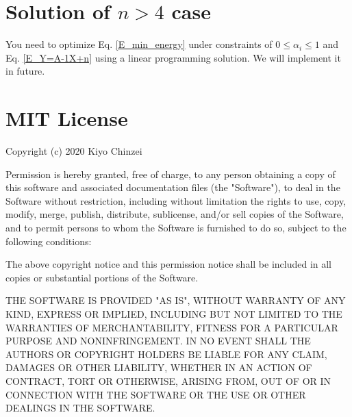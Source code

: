 \documentclass[dvipdfmx,uplatex]{article}
\begin{document}
\section{Solution of $n > 4$ case}
You need to optimize Eq. \ref{E_min_energy} under constraints of $0 \leq \alpha_i \leq 1$ and Eq. \ref{E_Y=A-1X+n} using a linear programming solution.
We will implement it in future.




\section*{MIT License}

Copyright (c) 2020 Kiyo Chinzei

Permission is hereby granted, free of charge, to any person obtaining a copy
of this software and associated documentation files (the "Software"), to deal
in the Software without restriction, including without limitation the rights
to use, copy, modify, merge, publish, distribute, sublicense, and/or sell
copies of the Software, and to permit persons to whom the Software is
furnished to do so, subject to the following conditions:

The above copyright notice and this permission notice shall be included in all
copies or substantial portions of the Software.

THE SOFTWARE IS PROVIDED "AS IS", WITHOUT WARRANTY OF ANY KIND, EXPRESS OR
IMPLIED, INCLUDING BUT NOT LIMITED TO THE WARRANTIES OF MERCHANTABILITY,
FITNESS FOR A PARTICULAR PURPOSE AND NONINFRINGEMENT. IN NO EVENT SHALL THE
AUTHORS OR COPYRIGHT HOLDERS BE LIABLE FOR ANY CLAIM, DAMAGES OR OTHER
LIABILITY, WHETHER IN AN ACTION OF CONTRACT, TORT OR OTHERWISE, ARISING FROM,
OUT OF OR IN CONNECTION WITH THE SOFTWARE OR THE USE OR OTHER DEALINGS IN THE
SOFTWARE.
\end{document}
